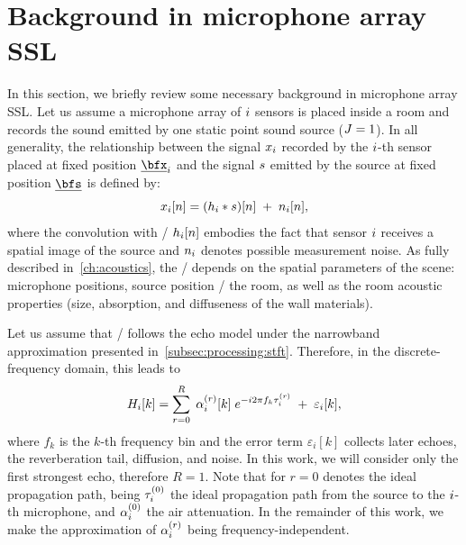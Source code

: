 \section{Background in microphone array SSL}\label{sec:background}
In this section, we briefly review some necessary background in microphone array \ac{SSL}.
Let us assume a microphone array of $i$ sensors is placed inside a room and records the sound emitted by one static point sound source ($J=1$).
In all generality, the relationship between the signal $x_{i}$ recorded by the $i$-th sensor placed at fixed position $\positionMicrophone_\idxMic$ and the signal $s$ emitted by the source at fixed position $\positionSource$ is defined by:
\begin{equation}\label{eq:mirage:anymic_time}
x_i[n] = (h_{i} \ast s)[n]  \; + \; n_{i}[n],
\end{equation}
where the convolution with \RIR/ $h_{i}[n]$ embodies the fact that sensor $i$ receives a spatial image of the source and $n_{i}$ denotes possible measurement noise.
As fully described in~\cref{ch:acoustics}, the \RIR/ depends on the spatial parameters of the scene: microphone positions, source position \wrt/ the room, as well as the room acoustic properties (size, absorption, and diffuseness of the wall materials).

\mynewline
Let us assume that \RIRs/ follows the echo model under the narrowband approximation presented in~\cref{subsec:processing:stft}.
Therefore, in the discrete-frequency domain, this leads to
\begin{equation}\label{eq:mirage:rir}
    H_{i}[k] = \sum_{r=0}^{R}  \; \alpha_{i}^{(r)}[k] \; {e}^{- {i} 2 \pi f_k \tau_{i}^{(r)}} \; + \; \varepsilon_{i}[k],
\end{equation}
where $f_k$ is the $k$-th frequency bin and the error term $\varepsilon_i[k]$ collects later echoes, the reverberation tail, diffusion, and noise.
In this work, we will consider only the first strongest echo, therefore $R = 1$.
Note that for $r=0$ denotes the ideal propagation path,
being $\tau^{(0)}_{i}$ the ideal propagation path from the source to the $i$-th microphone, and $\alpha^{(0)}_{i}$ the air attenuation.
In the remainder of this work, we make the approximation of $\alpha_i^{(r)}$ being frequency-independent.

